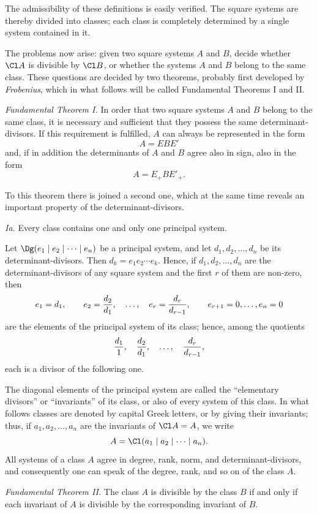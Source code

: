 The admissibility of these definitions is easily verified. The square systems are thereby divided into classes; each class is completely determined by a single system contained in it.

The problems now arise: given two square systems $A$ and $B$, decide whether $\Cl A$ is divisible by $\Cl B$, or whether the systems $A$ and $B$ belong to the same class. These questions are decided by two theorems, probably first developed by \emph{Frobenius}, which in what follows will be called Fundamental Theorems I and II.

\emph{Fundamental Theorem I.} In order that two square systems $A$ and $B$ belong to the same class, it is necessary and sufficient that they possess the same determinant-divisors. If this requirement is fulfilled, $A$ can always be represented in the form
\[
 A=EBE'
\]
and, if in addition the determinants of $A$ and $B$ agree also in sign, also in the form
\[
 A=E_+BE'_+.
\]

To this theorem there is joined a second one, which at the same time reveals an important property of the determinant-divisors.

\emph{Ia.} Every class contains one and only one principal system.

Let $\Dg(e_1\mid e_2\mid\cdots\mid e_n)$ be a principal system, and let $d_1,d_2,\ldots,d_n$ be its determinant-divisors. Then $d_k=e_1e_2\cdots e_k$. Hence, if $d_1,d_2,\ldots,d_n$ are the determinant-divisors of any square system and the first $r$ of them are non-zero, then
\[
 e_1=d_1,
 \qquad e_2={d_2\over d_1},
 \quad \ldots,\quad
 e_r={d_r\over d_{r-1}},
 \qquad e_{r+1}=0,\ldots,e_n=0
\]
are the elements of the principal system of its class; hence, among the quotients
\[
 {d_1\over 1},\quad {d_2\over d_1},\quad \ldots,\quad {d_r\over d_{r-1}},
\]
each is a divisor of the following one.

The diagonal elements of the principal system are called the ``elementary divisors'' or ``invariants'' of its class, or also of every system of this class. In what follows classes are denoted by capital Greek letters, or by giving their invariants; thus, if $a_1,a_2,\ldots,a_n$ are the invariants of $\Cl A=A$, we write
\[
 A=\Cl(a_1\mid a_2\mid\cdots\mid a_n).
\]
All systems of a class $A$ agree in degree, rank, norm, and determinant-divisors, and consequently one can speak of the degree, rank, and so on of the class $A$.

\emph{Fundamental Theorem II.} The class $A$ is divisible by the class $B$ if and only if each invariant of $A$ is divisible by the corresponding invariant of $B$.


